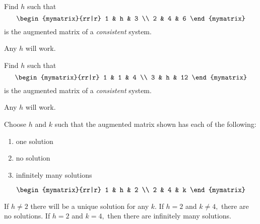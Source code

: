 \begin{enumialphparenastyle}
\begin{ex}
Find $h$ such that
\begin{equation*}
\begin{mymatrix}{rr|r}
1 & h & 3 \\
2 & 4 & 6
\end{mymatrix}
\end{equation*}
is the augmented matrix of a \textit{consistent} system. 
\begin{sol}
 Any $h$ will work.
\end{sol}
\end{ex}

\begin{ex}
Find $h$ such that
\begin{equation*}
\begin{mymatrix}{rr|r}
1 & 1 & 4 \\
3 & h & 12
\end{mymatrix}
\end{equation*}
is the augmented matrix of a \textit{consistent} system. 
\begin{sol}
 Any $h$ will work.
\end{sol}
\end{ex}


\begin{ex}
Choose $h$ and $k$ such that the augmented matrix shown has each of the following: 
\begin{enumerate}
\item one solution
\item no solution
\item infinitely many solutions
\end{enumerate}
\begin{equation*}
\begin{mymatrix}{rr|r}
1 & h & 2 \\
2 & 4 & k
\end{mymatrix} 
\end{equation*}
\begin{sol}
If $h\neq 2$ there will be a unique solution for any $k$. If $h=2$ and $%
k\neq 4,$ there are no solutions. If $h=2$ and $k=4,$ then there are
infinitely many solutions.
\end{sol}
\end{ex}



\end{enumialphparenastyle}
